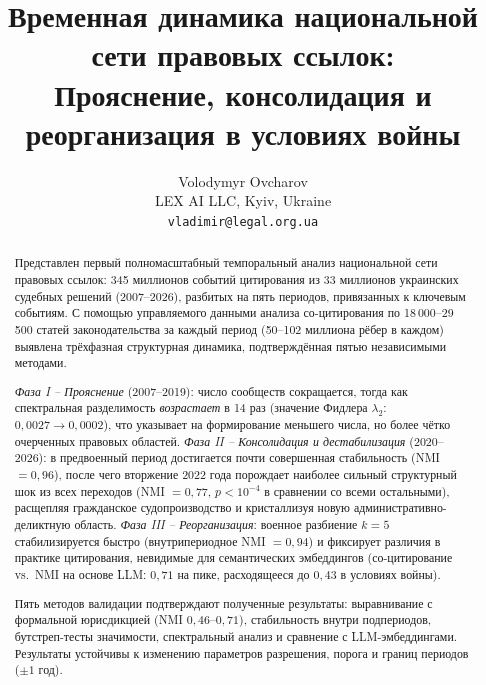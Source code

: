 \documentclass[11pt]{article}
\begin{document}
\title{Временная динамика национальной сети правовых ссылок:\\
Прояснение, консолидация и реорганизация в условиях войны}

\author{
  Volodymyr Ovcharov \\[6pt]
  LEX AI LLC, Kyiv, Ukraine \\[4pt]
  \texttt{vladimir@legal.org.ua}
}

\date{}

\maketitle

\begin{abstract}

Представлен первый полномасштабный темпоральный анализ национальной сети правовых ссылок: 345 миллионов событий цитирования из 33 миллионов украинских судебных решений (2007--2026), разбитых на пять периодов, привязанных к ключевым событиям.
С помощью управляемого данными анализа со-цитирования по 18\,000--29\,500 статей законодательства за каждый период (50--102 миллиона рёбер в каждом) выявлена трёхфазная структурная динамика, подтверждённая пятью независимыми методами.

\emph{Фаза I -- Прояснение} (2007--2019): число сообществ сокращается, тогда как спектральная разделимость \emph{возрастает} в 14 раз (значение Фидлера $\lambda_2$: $0{,}0027 \to 0{,}0002$), что указывает на формирование меньшего числа, но более чётко очерченных правовых областей.
\emph{Фаза II -- Консолидация и дестабилизация} (2020--2026): в предвоенный период достигается почти совершенная стабильность (NMI $= 0{,}96$), после чего вторжение 2022 года порождает наиболее сильный структурный шок из всех переходов (NMI $= 0{,}77$, $p < 10^{-4}$ в сравнении со всеми остальными), расщепляя гражданское судопроизводство и кристаллизуя новую административно-деликтную область.
\emph{Фаза III -- Реорганизация}: военное разбиение $k = 5$ стабилизируется быстро (внутрипериодное NMI $= 0{,}94$) и фиксирует различия в практике цитирования, невидимые для семантических эмбеддингов (со-цитирование vs.\ NMI на основе LLM: $0{,}71$ на пике, расходящееся до $0{,}43$ в условиях войны).

Пять методов валидации подтверждают полученные результаты: выравнивание с формальной юрисдикцией (NMI $0{,}46$--$0{,}71$), стабильность внутри подпериодов, бутстреп-тесты значимости, спектральный анализ и сравнение с LLM-эмбеддингами.
Результаты устойчивы к изменению параметров разрешения, порога и границ периодов ($\pm 1$ год).

\end{abstract}
\end{document}

